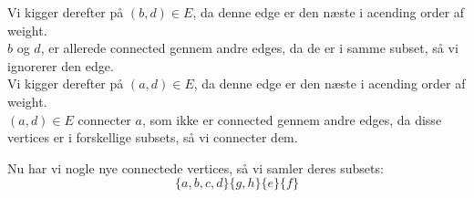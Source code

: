 \documentclass[a4paper,12pt]{article}
\begin{document}
Vi kigger derefter på $(b,d)\in E$, da denne edge er den næste i acending order af weight.\\
$b$ og $d$, er allerede connected gennem andre edges, da de er i samme subset, så vi ignorerer den edge.\\
Vi kigger derefter på $(a,d)\in E$, da denne edge er den næste i acending order af weight.\\
$(a,d)\in E$ connecter $a$, som ikke er connected gennem andre edges, da disse vertices er i forskellige subsets, så vi connecter dem.
\begin{figure}[H]
    \centering
    \caption*{}
\end{figure}
Nu har vi nogle nye connectede vertices, så vi samler deres subsets:
\[\{a,b,c,d\}\{g,h\}\{e\}\{f\}\]
\end{document}
